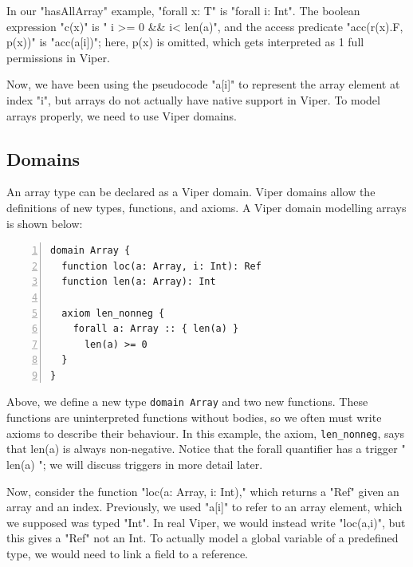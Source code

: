 \documentclass[msc,oneside]{ubcthesis}
\theoremstyle{definition}
\begin{document}
In our "hasAllArray" example, "forall x: T" is  "forall i: Int". The boolean expression "c(x)" is " i >= 0 && i< len(a)", and the access predicate "acc(r(x).F, p(x))" is "acc(a[i])"; here, p(x) is omitted, which gets interpreted as 1 full permissions in Viper.

Now, we have been using the pseudocode "a[i]" to represent the array element at index "i", but arrays do not actually have native support in Viper. To model arrays properly, we need to use Viper domains.



\subsection{Domains}
An array type can be declared as a Viper domain. Viper domains allow the definitions of new types, functions, and axioms. A Viper domain modelling arrays is shown below:

\begin{lstlisting}[language=silver,numbers=left, firstnumber=1, stepnumber=1]
domain Array {
  function loc(a: Array, i: Int): Ref
  function len(a: Array): Int

  axiom len_nonneg {
    forall a: Array :: { len(a) }
      len(a) >= 0
  }
}
\end{lstlisting}

Above, we define a new type \lstinline|domain Array| and two new functions. These functions are uninterpreted functions without bodies, so we often must write axioms to describe their behaviour. In this example, the axiom, \lstinline|len_nonneg|, says that len(a) is always non-negative. Notice that the forall quantifier has a trigger "{ len(a) }"; we will discuss triggers in more detail later.

Now, consider the function "loc(a: Array, i: Int)," which returns a "Ref" given an array and an index. Previously, we used "a[i]" to refer to an array element, which we supposed was typed "Int". In real Viper, we would instead write "loc(a,i)", but this gives a "Ref" not an Int. To actually model a global variable of a predefined type, we would need to link a field to a reference.
\end{document}
